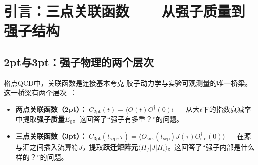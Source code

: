 \documentclass[12pt,a4paper]{ctexart}
\theoremstyle{definition}
\begin{document}
\begin{abstract}
\textbf{第五维度——矩阵元提取（§6）：}
系统阐述从裸三点关联函数到物理矩阵元的提取流程：(i) \textbf{比值法}——$R = C_{3\text{pt}} / C_{2\text{pt}}$ 消除重叠因子和指数衰减；(ii) \textbf{R̃方法}——通过相邻$t_{\text{sep}}$的差分加速平台到达；(iii) \textbf{双态拟合}——用解析形式 $R \approx c_0 + c_1 e^{-\Delta E(t_{\text{sep}}-t)} + c_1 e^{-\Delta E t}$ 拟合以分离跃迁项污染。

\textbf{第六维度——激发态污染的系统控制（§7）：}
详述三类策略：(i) \textbf{多态拟合}——系统比较two-simRR、two-sim等拟合方案对$t_{\text{sep}}^{\min}$和$n_{\text{ex}}$的敏感性；(ii) \textbf{求和法}——通过对插入时间$t$求和消除$O(e^{-\Delta E t_{\text{sep}}})$的激发态贡献；(iii) \textbf{GEVP变分法}——通过求解$C(t)v = \lambda(t)C(t_0)v$从扩展算符基中分离近似独立的能级。

\textbf{第七维度——代码实现与本库中的实战（§8）：}
展示\texttt{refer/zhangxin/gluon\_pdf\_workflow.py}和\texttt{snsc/main.py}中三点函数构造的实际代码——从VVV张量构造、perambulator收缩、到OPE非连通三点函数的系综关联和bootstrap/jackknife误差传播。
\end{abstract}

\tableofcontents
\newpage

\section{引言：三点关联函数——从强子质量到强子结构}

\subsection{2pt与3pt：强子物理的两个层次}

格点QCD中，关联函数是连接基本夸克-胶子动力学与实验可观测量的唯一桥梁。这一桥梁有两个层次~\cite{GattringerLang2010}：

\begin{itemize}[leftmargin=*]
    \item \textbf{两点关联函数（2pt）：} $C_{2\text{pt}}(t) = \langle O(t) O^\dagger(0) \rangle$ — 从大$t$下的指数衰减率中提取\textbf{强子质量}$E_0$。这回答了``强子有多重？''的问题。
    \item \textbf{三点关联函数（3pt）：} $C_{3\text{pt}}(t_{\text{sep}}, \tau) = \langle O_{\text{snk}}(t_{\text{sep}}) J(\tau) O_{\text{src}}^\dagger(0) \rangle$ — 在源与汇之间插入流算符$J$，提取\textbf{跃迁矩阵元}$\langle H_f|J|H_i\rangle$。这回答了``强子内部是什么样的？''的问题。
\end{itemize}
\end{document}
